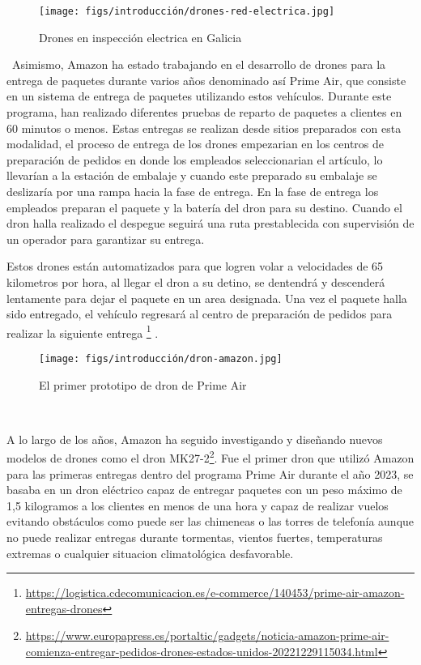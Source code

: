 \begin{figure} [H]
  \begin{center}
    \texttt{[image: figs/introducción/drones-red-electrica.jpg]}
  \end{center}
  \caption{Drones en inspección electrica en Galicia}
  \label{fig:Fenosa}
\end{figure}\
Asimismo, Amazon ha estado trabajando en el desarrollo de drones para la entrega de paquetes durante varios años denominado así Prime Air\cite{AmazonPrimeAir}, 
que consiste en un sistema de entrega de paquetes utilizando estos vehículos. Durante este programa, han realizado diferentes pruebas de reparto de paquetes a clientes
en 60 minutos o menos. Estas entregas se realizan desde sitios preparados con esta modalidad, el proceso de entrega de los drones empezarian en los centros de preparación de pedidos en 
donde los empleados seleccionarian el artículo, lo llevarían a la estación de embalaje y cuando este preparado su embalaje se deslizaría por una rampa hacia la fase de
entrega. 
En la fase de entrega los empleados preparan el paquete y la batería del dron para su destino. Cuando el dron halla realizado el despegue seguirá una ruta prestablecida con supervisión
de un operador para garantizar su entrega. \newline

Estos drones están automatizados para que logren volar a velocidades de 65 kilometros por hora, al llegar el dron a su detino, se dentendrá y descenderá lentamente para dejar el 
paquete en un area designada. Una vez el paquete halla sido entregado, el vehículo regresará al centro de preparación de pedidos para realizar la siguiente entrega 
\footnote{\url{https://logistica.cdecomunicacion.es/e-commerce/140453/prime-air-amazon-entregas-drones}} . 

\begin{figure} [H]
  \begin{center}
    \texttt{[image: figs/introducción/dron-amazon.jpg]}
  \end{center}
  \caption{El primer prototipo de dron de Prime Air}
  \label{fig:PrimerPrimeAir}
\end{figure}\

A lo largo de los años, Amazon ha seguido investigando y diseñando nuevos modelos de drones como el dron MK27-2\footnote{\url{https://www.europapress.es/portaltic/gadgets/noticia-amazon-prime-air-comienza-entregar-pedidos-drones-estados-unidos-20221229115034.html}}. Fue el primer 
dron que utilizó Amazon para 
las primeras entregas dentro del programa Prime Air durante el año 2023, se basaba en un dron eléctrico capaz de entregar paquetes con un peso máximo de 1,5 kilogramos a los clientes en menos de una
hora y capaz de realizar vuelos evitando obstáculos como puede ser las chimeneas o las torres de telefonía aunque no puede realizar entregas durante tormentas, vientos fuertes, temperaturas
extremas o cualquier situacion climatológica desfavorable. 

